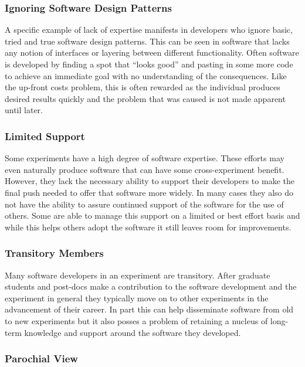 \subsubsection{Ignoring Software Design Patterns}

A specific example of lack of expertise manifests in developers who
ignore basic, tried and true software design patterns.  This can be
seen in software that lacks any notion of interfaces or layering
between different functionality.  Often software is developed by
finding a spot that ``looks good'' and pasting in some more code to
achieve an immediate goal with no understanding of the consequences.
Like the up-front costs problem, this is often rewarded as the
individual produces desired results quickly and the problem that was
caused is not made apparent until later.

\subsubsection{Limited Support}

Some experiments have a high degree of software expertise.  These
efforts may even naturally produce software that can have some
cross-experiment benefit.  However, they lack the necessary ability to
support their developers to make the final push needed to offer that
software more widely.  In many cases they also do not have the ability
to assure continued support of the software for the use of others.
Some are able to manage this support on a limited or best effort basis
and while this helps others adopt the software it still leaves room
for improvements.

\subsubsection{Transitory Members}

Many software developers in an experiment are transitory.  After
graduate students and post-docs make a contribution to the software
development and the experiment in general they typically move on to
other experiments in the advancement of their career.  In part this
can help disseminate software from old to new experiments but it also
posses a problem of retaining a nucleus of long-term knowledge and
support around the software they developed.

\subsubsection{Parochial View}

